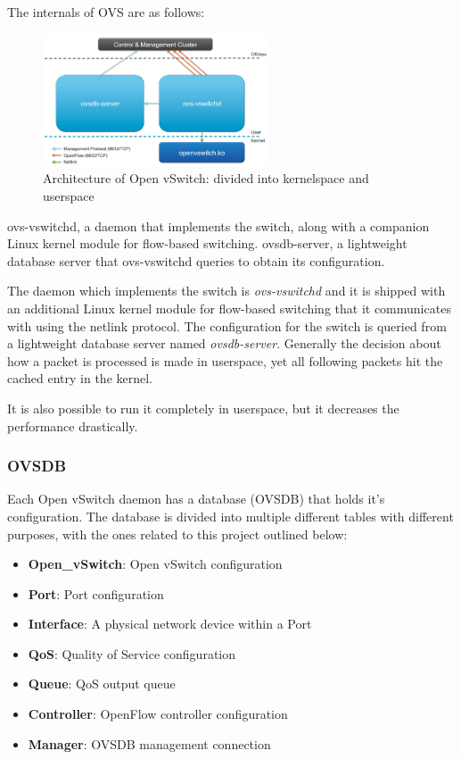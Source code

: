 The internals of OVS are as follows:
\begin{figure}[H]
\centering
\includegraphics[width=0.6\textwidth]{images/fundamentals/openvswitch_architecture.png}
\caption{Architecture of Open vSwitch: divided into kernelspace and userspace}
\end{figure}

ovs-vswitchd, a daemon that implements the switch, along with a companion Linux kernel module for flow-based switching.
ovsdb-server, a lightweight database server that ovs-vswitchd queries to obtain its configuration.

The daemon which implements the switch is \textit{ovs-vswitchd} and it is shipped with an additional Linux kernel module for flow-based switching that it communicates with using the netlink protocol. The configuration for the switch is queried from a lightweight database server named \textit{ovsdb-server}.
Generally the decision about how a packet is processed is made in userspace, yet all following packets hit the cached entry in the kernel.

It is also possible to run it completely in userspace, but it decreases the performance drastically.



\subsubsection{OVSDB}

Each Open vSwitch daemon has a database (OVSDB) that holds it's configuration. The database is divided into multiple different tables with different purposes, with the ones related to this project outlined below:
\begin{itemize}
\item \textbf{Open\_vSwitch}: Open vSwitch configuration
\item \textbf{Port}: Port configuration
\item \textbf{Interface}: A physical network device within a Port
\item \textbf{QoS}: Quality of Service configuration
\item \textbf{Queue}: QoS output queue
\item \textbf{Controller}: OpenFlow controller configuration
\item \textbf{Manager}: OVSDB management connection
\end{itemize}


